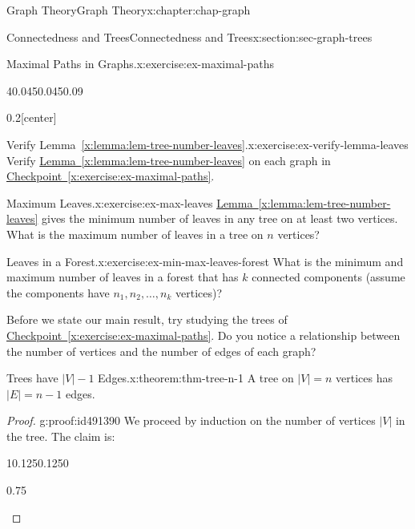 \documentclass[oneside,10pt,]{book}
\newcommand{\xreffont}{\relax}
\numberwithin{equation}{section}
\begin{document}
\begin{chapterptx}{Graph Theory}{}{Graph Theory}{}{}{x:chapter:chap-graph}
\begin{sectionptx}{Connectedness and Trees}{}{Connectedness and Trees}{}{}{x:section:sec-graph-trees}
\begin{inlineexercise}{Maximal Paths in Graphs.}{x:exercise:ex-maximal-paths}
\begin{sidebyside}{4}{0.045}{0.045}{0.09}
\begin{sbspanel}{0.2}[center]
{
}%
\end{sbspanel}%
\end{sidebyside}%
\end{inlineexercise}
\begin{inlineexercise}{Verify Lemma~{\xreffont\ref*{x:lemma:lem-tree-number-leaves}}.}{x:exercise:ex-verify-lemma-leaves}%
Verify \hyperref[x:lemma:lem-tree-number-leaves]{Lemma~{\xreffont\ref{x:lemma:lem-tree-number-leaves}}} on each graph in \hyperref[x:exercise:ex-maximal-paths]{Checkpoint~{\xreffont\ref{x:exercise:ex-maximal-paths}}}.%
\end{inlineexercise}
\begin{inlineexercise}{Maximum Leaves.}{x:exercise:ex-max-leaves}%
\hyperref[x:lemma:lem-tree-number-leaves]{Lemma~{\xreffont\ref{x:lemma:lem-tree-number-leaves}}} gives the minimum number of leaves in any tree on at least two vertices. What is the maximum number of leaves in a tree on \(n\) vertices?%
\end{inlineexercise}
\begin{inlineexercise}{Leaves in a Forest.}{x:exercise:ex-min-max-leaves-forest}%
What is the minimum and maximum number of leaves in a forest that has \(k\) connected components (assume the components have \(n_1, n_2, \ldots, n_k\) vertices)?%
\end{inlineexercise}
Before we state our main result, try studying the trees of \hyperref[x:exercise:ex-maximal-paths]{Checkpoint~{\xreffont\ref{x:exercise:ex-maximal-paths}}}. Do you notice a relationship between the number of vertices and the number of edges of each graph?%
\begin{theorem}{Trees have \(|V|-1\) Edges.}{}{x:theorem:thm-tree-n-1}%
A tree on \(|V| = n\) vertices has \(|E| = n-1\) edges.%
\end{theorem}
\begin{proof}{}{g:proof:id491390}
We proceed by induction on the number of vertices \(|V|\) in the tree. The claim is:%
\begin{sidebyside}{1}{0.125}{0.125}{0}%
\begin{sbspanel}{0.75}%

\end{sbspanel}
\end{sidebyside}
\end{proof}
\end{sectionptx}
\end{chapterptx}
\end{document}
